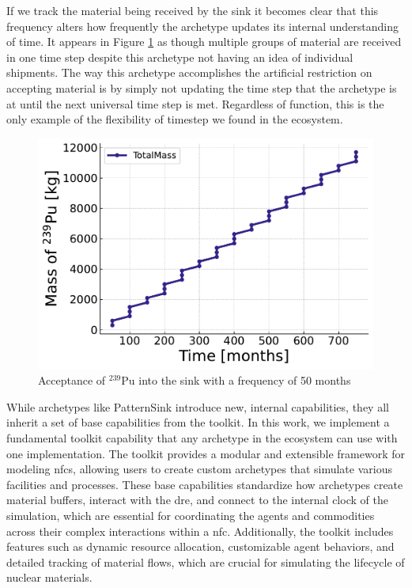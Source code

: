 If we track the material being received by the sink it becomes clear that this
frequency alters how frequently the archetype updates its internal
understanding of time. It appears in Figure \ref{fig:pattern_freq_50} as though
multiple groups of material are received in one time step despite this
archetype not having an idea of individual shipments. The way this archetype
accomplishes the artificial restriction on accepting material is by simply not
updating the time step that the archetype is at until the next universal time
step is met. Regardless of function, this is the only example of the
flexibility of timestep we found in the ecosystem.

\begin{figure}[!ht]
    \centering
    \includegraphics[scale=0.75]{images/cyclus/pattern_sink_fuel_transactions.pdf}
    \caption{Acceptance of $^{239}$Pu into the sink with a frequency of 50 months}
    \label{fig:pattern_freq_50}
\end{figure}

While archetypes like PatternSink introduce new, internal capabilities, they
all inherit a set of base capabilities from the \cyclus toolkit. In this work,
we implement a fundamental toolkit capability that any archetype in the \cyclus
ecosystem can use with one implementation. The \cyclus toolkit provides a
modular and extensible framework for modeling \glspl{nfc}, allowing users to
create custom archetypes that simulate various facilities and processes. These
base capabilities standardize how archetypes create material buffers, interact
with the \gls{dre}, and connect to the internal clock of the simulation, which
are essential for coordinating the agents and commodities across their complex
interactions within a \gls{nfc}. Additionally, the toolkit includes features
such as dynamic resource allocation, customizable agent behaviors, and detailed
tracking of material flows, which are crucial for simulating the lifecycle of
nuclear materials.


